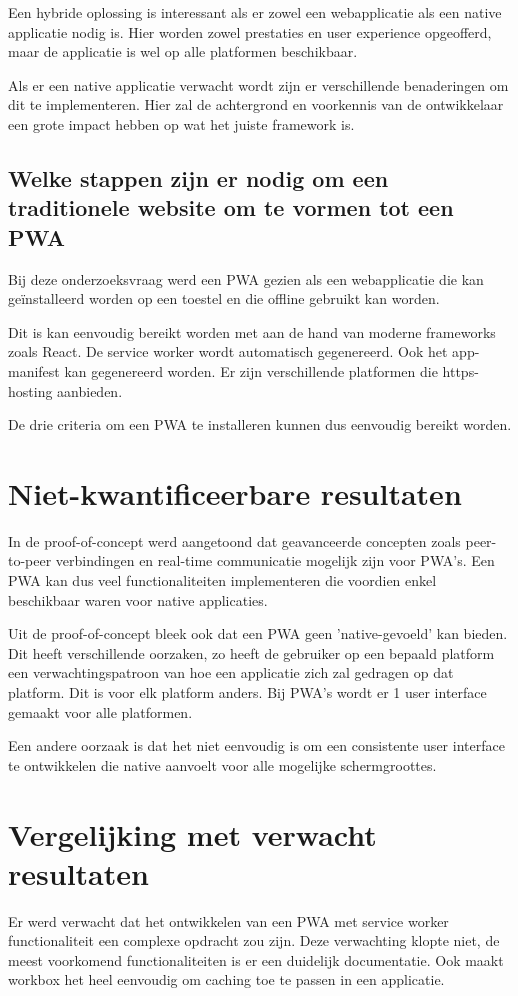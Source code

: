 		Een hybride oplossing is interessant als er zowel een webapplicatie als een native applicatie nodig is. Hier worden zowel prestaties en user experience opgeofferd, maar de applicatie is wel op alle platformen beschikbaar. 
		
		Als er een native applicatie verwacht wordt zijn er verschillende benaderingen om dit te implementeren. Hier zal de achtergrond en voorkennis van de ontwikkelaar een grote impact hebben op wat het juiste framework is.
	
	\subsection{Welke stappen zijn er nodig om een traditionele website om te vormen tot een PWA}
		
		Bij deze onderzoeksvraag werd een PWA gezien als een webapplicatie die kan geïnstalleerd worden op een toestel en die offline gebruikt kan worden.
		
		Dit is kan eenvoudig bereikt worden met aan de hand van moderne frameworks zoals React. De service worker wordt automatisch gegenereerd. Ook het app-manifest kan gegenereerd worden. Er zijn verschillende platformen die https-hosting aanbieden. 
		
		De drie criteria om een PWA te installeren kunnen dus eenvoudig bereikt worden.
	
\section{Niet-kwantificeerbare resultaten}
	In de proof-of-concept werd aangetoond dat geavanceerde concepten zoals peer-to-peer verbindingen en real-time communicatie mogelijk zijn voor PWA's. Een PWA kan dus veel functionaliteiten implementeren die voordien enkel beschikbaar waren voor native applicaties.
	
	Uit de proof-of-concept bleek ook dat een PWA geen 'native-gevoeld' kan bieden. 
	Dit heeft verschillende oorzaken, zo heeft de gebruiker op een bepaald platform een verwachtingspatroon van hoe een applicatie zich zal gedragen op dat platform. Dit is voor elk platform anders. Bij PWA's wordt er 1 user interface gemaakt voor alle platformen.
	
	Een andere oorzaak is dat het niet eenvoudig is om een consistente user interface te ontwikkelen die native aanvoelt voor alle mogelijke schermgroottes.
	
\section{Vergelijking met verwacht resultaten}
	Er werd verwacht dat het ontwikkelen van een PWA met service worker functionaliteit een complexe opdracht zou zijn.
	Deze verwachting klopte niet, de meest voorkomend functionaliteiten is er een duidelijk documentatie. Ook maakt workbox het heel eenvoudig om caching toe te passen in een applicatie.
	

